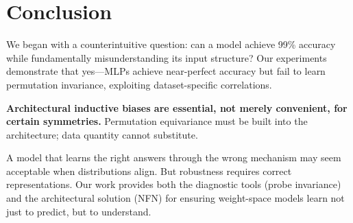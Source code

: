 \section{Conclusion}

We began with a counterintuitive question: can a model achieve 99\% accuracy while fundamentally misunderstanding its input structure? Our experiments demonstrate that yes---MLPs achieve near-perfect accuracy but fail to learn permutation invariance, exploiting dataset-specific correlations.

\textbf{Architectural inductive biases are essential, not merely convenient, for certain symmetries.} Permutation equivariance must be built into the architecture; data quantity cannot substitute.

A model that learns the right answers through the wrong mechanism may seem acceptable when distributions align. But robustness requires correct representations. Our work provides both the diagnostic tools (probe invariance) and the architectural solution (NFN) for ensuring weight-space models learn not just to predict, but to understand.
